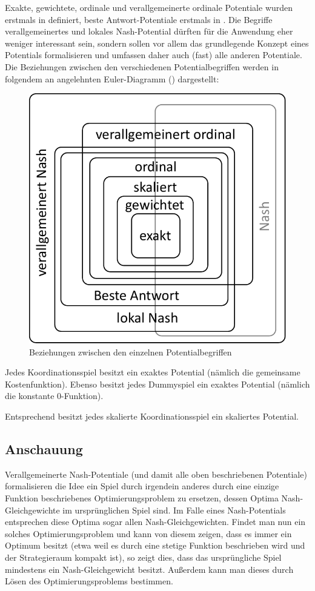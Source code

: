 Exakte, gewichtete, ordinale und verallgemeinerte ordinale Potentiale wurden erstmals in \cite{MonShap} definiert, beste Antwort-Potentiale erstmals in \cite{BestRespPot}. Die Begriffe verallgemeinertes und lokales Nash-Potential dürften für die Anwendung eher weniger interessant sein, sondern sollen vor allem das grundlegende Konzept eines Potentials formalisieren und umfassen daher auch (fast) alle anderen Potentiale. Die Beziehungen zwischen den verschiedenen Potentialbegriffen werden in folgendem an \cite{BestRespPot} angelehnten Euler-Diagramm () dargestellt:

\begin{figure}[h]\centering
	\includegraphics[width=.4\textwidth]{../Bilder/EulerDiagPotentiale.pdf}
	\caption{Beziehungen zwischen den einzelnen Potentialbegriffen}\label{diag:Potentiale}
\end{figure}

\begin{bsp}
	Jedes Koordinationsspiel besitzt ein exaktes Potential (nämlich die gemeinsame Kostenfunktion). Ebenso besitzt jedes Dummyspiel ein exaktes Potential (nämlich die konstante $0$-Funktion).
	
	Entsprechend besitzt jedes skalierte Koordinationsspiel ein skaliertes Potential.
\end{bsp}

\subsection{Anschauung}

Verallgemeinerte Nash-Potentiale (und damit alle oben beschriebenen Potentiale) formalisieren die Idee ein Spiel durch irgendein anderes durch eine einzige Funktion beschriebenes Optimierungsproblem zu ersetzen, dessen Optima Nash-Gleichgewichte im ursprünglichen Spiel sind. Im Falle eines Nash-Potentials entsprechen diese Optima sogar allen Nash-Gleichgewichten. Findet man nun ein solches Optimierungsproblem und kann von diesem zeigen, dass es immer ein Optimum besitzt (etwa weil es durch eine stetige Funktion beschrieben wird und der Strategieraum kompakt ist), so zeigt dies, dass das ursprüngliche Spiel mindestens ein Nash-Gleichgewicht besitzt. Außerdem kann man dieses durch Lösen des Optimierungsproblems bestimmen.

